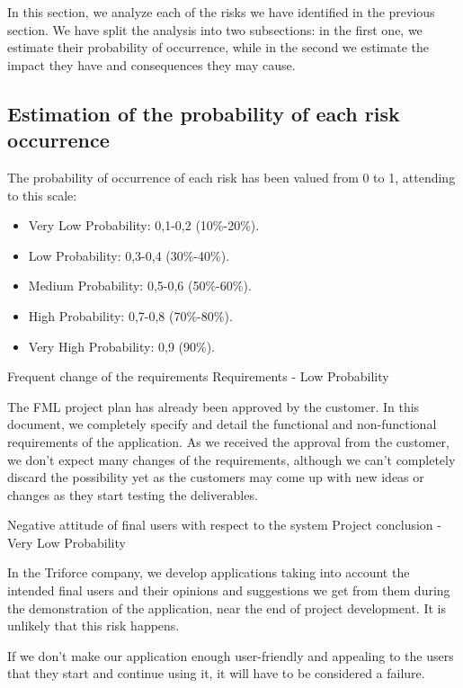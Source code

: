 
In this section, we analyze each of the risks we have identified in the previous section. We have split the analysis into two subsections: in the first one, we estimate their probability of occurrence, while in the second we estimate the impact they have and consequences they may cause.

\subsection{Estimation of the probability of each risk occurrence}
The probability of occurrence of each risk has been valued from 0 to 1, attending to this scale:
\begin{itemize}
\item Very Low Probability: 0,1-0,2 (10\%-20\%).
\item Low Probability: 0,3-0,4 (30\%-40\%).
\item Medium Probability: 0,5-0,6 (50\%-60\%).
\item High Probability: 0,7-0,8 (70\%-80\%).
\item Very High Probability: 0,9 (90\%).
\end{itemize}


\begin{risk}{Frequent change of the requirements}
\riskcat Requirements
 - Low Probability 

The FML project plan has already been approved by the customer. In this document, we completely specify and detail the functional and non-functional requirements of the application. As we received the approval from the customer, we don't expect many changes of the requirements, although we can't completely discard the possibility yet as the customers may come up with new ideas or changes as they start testing the deliverables.
\end{risk}

\begin{risk}{Negative attitude of final users with respect to the system}
\riskcat Project conclusion
 - Very Low Probability 

In the Triforce company, we develop applications taking into account the intended final users and their opinions and suggestions we get from them during the demonstration of the application, near the end of project development. It is unlikely that this risk happens. 

If we don't make our application enough user-friendly and appealing to the users that they start and continue using it, it will have to be considered a failure. 
\end{risk}

